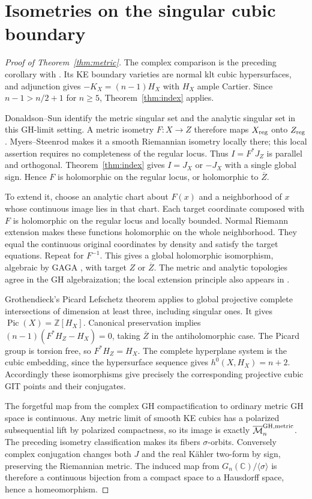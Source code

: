 \documentclass[11pt]{article}
\newcommand{\C}{\mathbb C}
\begin{document}
\section{Isometries on the singular cubic boundary}
\begin{proof}[Proof of Theorem~\ref{thm:metric}]
The complex comparison is the preceding corollary with \cite{OAI}.
Its KE boundary varieties are normal klt cubic hypersurfaces, and
adjunction gives $-K_X=(n-1)H_X$ with $H_X$ ample Cartier.
Since $n-1>n/2+1$ for $n\geq5$, Theorem~\ref{thm:index} applies.

Donaldson--Sun \cite[Proposition 2.14]{DSII} identify the metric singular
set and the analytic singular set in this GH-limit setting. A metric
isometry $F:X\to Z$ therefore maps $X_{\rm reg}$ onto $Z_{\rm reg}$.
Myers--Steenrod makes it a smooth Riemannian isometry locally there;
this local assertion requires no completeness of the regular locus.
Thus $I=F^*J_Z$ is parallel and orthogonal. Theorem~\ref{thm:index}
gives $I=J_X$ or $-J_X$ with a single global sign. Hence $F$ is
holomorphic on the regular locus, or holomorphic to $\overline Z$.

To extend it, choose an analytic chart about $F(x)$ and a neighborhood
of $x$ whose continuous image lies in that chart. Each target coordinate
composed with $F$ is holomorphic on the regular locus and locally
bounded. Normal Riemann extension makes these functions holomorphic
on the whole neighborhood. They equal the continuous original
coordinates by density and satisfy the target equations. Repeat for
$F^{-1}$. This gives a global holomorphic isomorphism, algebraic by
GAGA \cite[Proposition 15]{GAGA}, with target $Z$ or $\overline Z$.
The metric and analytic
topologies agree in the GH algebraization; the local extension
principle also appears in \cite[Proposition 2.4]{DSII}.

Grothendieck's Picard Lefschetz theorem
\cite[Expos\'e XII, Corollaire 3.7]{SGA2} applies to global projective
complete intersections of dimension at least three, including singular
ones. It gives $\operatorname{Pic}(X)=\mathbb Z[H_X]$.
Canonical preservation implies
$(n-1)(F^*H_Z-H_X)=0$, taking $\overline Z$ in the antiholomorphic
case. The Picard group is torsion free, so $F^*H_Z=H_X$.
The complete hyperplane system is the cubic embedding, since the
hypersurface sequence gives $h^0(X,H_X)=n+2$. Accordingly these
isomorphisms give precisely the corresponding projective cubic
GIT points and their conjugates.

The forgetful map from the complex GH compactification to ordinary
metric GH space is continuous. Any metric limit of smooth KE cubics
has a polarized subsequential lift by polarized compactness, so its
image is exactly $\overline{\mathcal M}_{n}^{\rm GH,metric}$.
The preceding isometry classification makes its fibers $\sigma$-orbits.
Conversely complex conjugation changes both $J$ and the real K\"ahler
two-form by sign, preserving the Riemannian metric. The induced map
from $G_n(\C)/\langle\sigma\rangle$ is therefore a continuous
bijection from a compact space to a Hausdorff space, hence a
homeomorphism.
\end{proof}
\end{document}
